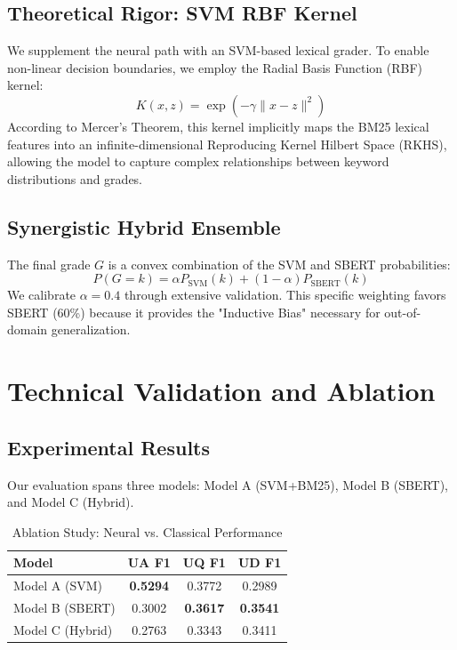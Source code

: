 \documentclass[conference]{IEEEtran}
\begin{document}
\subsection{Theoretical Rigor: SVM RBF Kernel}
We supplement the neural path with an SVM-based lexical grader. To enable non-linear decision boundaries, we employ the Radial Basis Function (RBF) kernel:
\begin{equation}
K(x,z) = \exp(-\gamma \|x-z\|^2)
\end{equation}
According to Mercer's Theorem, this kernel implicitly maps the BM25 lexical features into an infinite-dimensional Reproducing Kernel Hilbert Space (RKHS), allowing the model to capture complex relationships between keyword distributions and grades.

\subsection{Synergistic Hybrid Ensemble}
The final grade $G$ is a convex combination of the SVM and SBERT probabilities:
\begin{equation}
P(G=k) = \alpha P_{\text{SVM}}(k) + (1-\alpha) P_{\text{SBERT}}(k)
\end{equation}
We calibrate $\alpha=0.4$ through extensive validation. This specific weighting favors SBERT (60\%) because it provides the "Inductive Bias" necessary for out-of-domain generalization.

\section{Technical Validation and Ablation}
\subsection{Experimental Results}
Our evaluation spans three models: Model A (SVM+BM25), Model B (SBERT), and Model C (Hybrid).

\begin{table}[h]
\centering
\caption{Ablation Study: Neural vs. Classical Performance}
\begin{tabular}{lccc}
\toprule
Model & UA F1 & UQ F1 & UD F1 \\
\midrule
Model A (SVM) & \textbf{0.5294} & 0.3772 & 0.2989 \\
Model B (SBERT) & 0.3002 & \textbf{0.3617} & \textbf{0.3541} \\
Model C (Hybrid) & 0.2763 & 0.3343 & 0.3411 \\
\bottomrule
\end{tabular}
\end{table}
\end{document}
